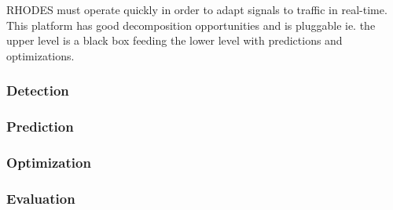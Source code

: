 RHODES must operate quickly in order to adapt signals to traffic in real-time. This platform has good decomposition opportunities and is pluggable ie. the upper level is a black box feeding the lower level with predictions and optimizations.

\subsubsection*{Detection}


\subsubsection*{Prediction}


\subsubsection*{Optimization}

\subsubsection*{Evaluation}
